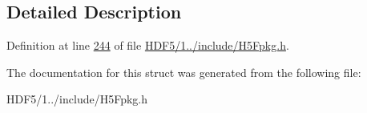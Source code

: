 \subsection{Detailed Description}


Definition at line \hyperlink{_h_d_f5_21_810_81_2include_2_h5_fpkg_8h_source_l00244}{244} of file \hyperlink{_h_d_f5_21_810_81_2include_2_h5_fpkg_8h_source}{H\+D\+F5/1../include/\+H5\+Fpkg.\+h}.



The documentation for this struct was generated from the following file\+:\begin{DoxyCompactItemize}
\item 
H\+D\+F5/1../include/\+H5\+Fpkg.\+h\end{DoxyCompactItemize}
